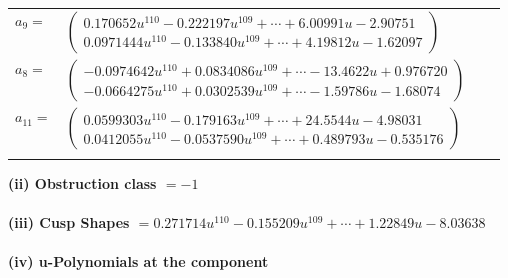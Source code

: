 \documentclass[1p]{elsarticle_modified}
\theoremstyle{definition}
\begin{document}
\begin{tabular}{m{7pt} m{180pt} m{7pt} m{180pt} }
\flushright $a_{9}=$&$\begin{pmatrix}0.170652 u^{110}-0.222197 u^{109}+\cdots+6.00991 u-2.90751\\0.0971444 u^{110}-0.133840 u^{109}+\cdots+4.19812 u-1.62097\end{pmatrix}$ \\
\flushright $a_{8}=$&$\begin{pmatrix}-0.0974642 u^{110}+0.0834086 u^{109}+\cdots-13.4622 u+0.976720\\-0.0664275 u^{110}+0.0302539 u^{109}+\cdots-1.59786 u-1.68074\end{pmatrix}$ \\
\flushright $a_{11}=$&$\begin{pmatrix}0.0599303 u^{110}-0.179163 u^{109}+\cdots+24.5544 u-4.98031\\0.0412055 u^{110}-0.0537590 u^{109}+\cdots+0.489793 u-0.535176\end{pmatrix}$\\&\end{tabular}
\flushleft \textbf{(ii) Obstruction class $= -1$}\\~\\
\flushleft \textbf{(iii) Cusp Shapes $= 0.271714 u^{110}-0.155209 u^{109}+\cdots+1.22849 u-8.03638$}\\~\\
\newpage\renewcommand{\arraystretch}{1}
\flushleft \textbf{(iv) u-Polynomials at the component}\newline \\
\end{document}
